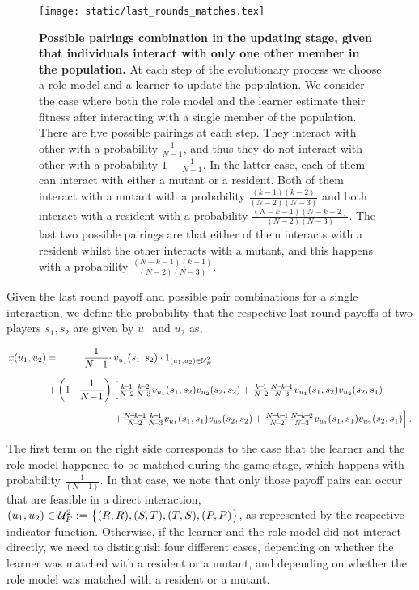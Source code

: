 \documentclass[11pt]{article}
\newcommand{\splitatcommas}[1]{%
  \begingroup
  \begingroup\lccode`~=`, \lowercase{\endgroup
    \edef~{\mathchar\the\mathcode`, \penalty0 \noexpand\hspace{0pt plus 1em}}%
  }\mathcode`,="8000 #1%
  \endgroup
}
\theoremstyle{plainCl1}
\theoremstyle{plainCl2}
\begin{document}
\begin{figure}[!htbp]
  \centering
  \texttt{[image: static/last\_rounds\_matches.tex]}
  \caption{\textbf{Possible pairings combination in the updating stage, given
  that individuals interact with only one other member in the population.} At
  each step of the evolutionary process we choose a role model and a learner to
  update the population. We consider the case where both the role model and the
  learner estimate their fitness after interacting with a single member of the
  population. There are five possible pairings at each step. They interact with
  other with a probability \(\frac{1}{N - 1}\), and thus they do not interact
  with other with a probability \(1 - \frac{1}{N - 1}\). In
  the latter case, each of them can interact with either a mutant or a resident.
  Both of them interact with a mutant with a probability
  $\frac{(k-1)(k-2)}{(N-2)(N-3)}$ and both interact with a resident with a
  probability $\frac{(N-k-1)(N-k-2)}{(N-2)(N-3)}$. The last two possible pairings
  are that either of them interacts with a resident whilst the other interacts
  with a mutant, and this happens with a probability $\frac{(N-k-1)(k-1)}{(N-2)(N-3)}$.}
  \label{fig:single_pairs}
\end{figure}

Given the last round payoff and possible pair combinations for a single interaction,
we define the probability that the respective last round payoffs of two players
\(s_1, s_2\) are given by $u_1$ and $u_2$ as,

\begin{equation}\label{eq:Chi}
\setlength{\arraycolsep}{1pt}
\begin{array}{llrl}
x(u_1,u_2)	 &=&\displaystyle \frac{1}{N\!-\!1}\cdot  &v_{u_1}(s_1,s_2)\cdot 1_{(u_1,u_2)\in \mathcal{U}^2_F}\\[0.5cm]
&+	
&\displaystyle \left(1\!-\!\frac{1}{N\!-\!1}\right)  
&\left[ \frac{k\!-\!1}{N\!-\!2}\frac{k\!-\!2}{N\!-\!3} v_{u_1}(s_1,s_2) v_{u_2}(s_2,s_2) + 
 \frac{k\!-\!1}{N\!-\!2}\frac{N\!-\!k\!-\!1}{N\!-\!3} v_{u_1}(s_1,s_2) v_{u_2}(s_2,s_1)\right.\\[0.5cm]
&&&\left. +\frac{N\!-\!k\!-\!1}{N\!-\!2}\frac{k\!-\!1}{N\!-\!3} v_{u_1}(s_1,s_1) v_{u_2}(s_2,s_2) + 
 \frac{N\!-\!k\!-\!1}{N\!-\!2}\frac{N\!-\!k\!-\!2}{N\!-\!3} v_{u_1}(s_1,s_1) v_{u_2}(s_2,s_1)\right].
\end{array}
\end{equation}

The first term on the right side corresponds to the case that the learner and
the role model happened to be matched during the game stage, which happens with
probability $\frac{1}{(N\!-\!1)}$. In that case, we note that only those payoff pairs
can occur that are feasible in a direct interaction, $\splitatcommas{(u_1,u_2)\in
\mathcal{U}^2_F:=\big\{ (R,R), (S,T), (T,S), (P,P) \big\}}$, as represented by
the respective indicator function. Otherwise, if the learner and the role model
did not interact directly, we need to distinguish four different cases,
depending on whether the learner was matched with a resident or a mutant, and
depending on whether the role model was matched with a resident or a mutant.
\end{document}
